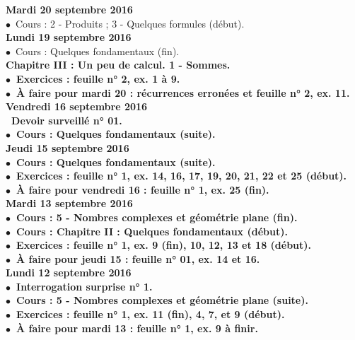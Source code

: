 \documentclass[12pt,a4paper]{article}
\begin{document}
\noindent\textbf{\bf Mardi 20 septembre 2016 }\\
$\bullet$\ Cours : 2 - Produits ; 3 - Quelques formules (début).\vspace{.4cm}\\

\noindent\textbf{Lundi 19 septembre 2016 }\\
$\bullet$\ Cours : Quelques fondamentaux (fin).\\
\bf Chapitre III \rm : Un peu de calcul. 1 - Sommes.\\
$\bullet$\ Exercices : feuille n° 2, ex. 1 à 9.\\
$\bullet$\ À faire pour mardi 20 : récurrences erronées et feuille n° 2, ex. 11.\vspace{.4cm}\\

\noindent\textbf{Vendredi 16 septembre 2016 }\\
\bu\ Devoir surveillé n° 01.\\
$\bullet$\ Cours : Quelques fondamentaux (suite).\vspace{.4cm}\\

\noindent\textbf{Jeudi 15 septembre 2016 }\\
$\bullet$\ Cours : Quelques fondamentaux (suite).\\
$\bullet$\ Exercices : feuille n° 1, ex. 14, 16, 17, 19, 20, 21, 22 et 25 (début).\\
$\bullet$\ À faire pour vendredi 16 : feuille n° 1, ex. 25 (fin).\vspace{.4cm}\\
 
\noindent\textbf{\bf Mardi 13 septembre 2016 }\\
$\bullet$\ Cours : 5 - Nombres complexes et géométrie plane (fin).\\
$\bullet$\ Cours : \bf Chapitre II \rm : Quelques fondamentaux (début).\\
$\bullet$\ Exercices : feuille n° 1, ex. 9 (fin), 10, 12, 13 et 18 (début).\\
$\bullet$\ À faire pour jeudi 15 : feuille n° 01, ex. 14 et 16.\vspace{.4cm}\\

\noindent\textbf{\bf Lundi 12 septembre 2016 }\\
$\bullet$\ Interrogation surprise n° 1.\\
$\bullet$\ Cours : 5 - Nombres complexes et géométrie plane (suite).\\
$\bullet$\ Exercices : feuille n° 1, ex. 11 (fin), 4, 7, et 9 (début).\\
$\bullet$\ À faire pour mardi 13 : feuille n° 1, ex. 9 à finir.\vspace{.4cm}\\
 
\end{document}
